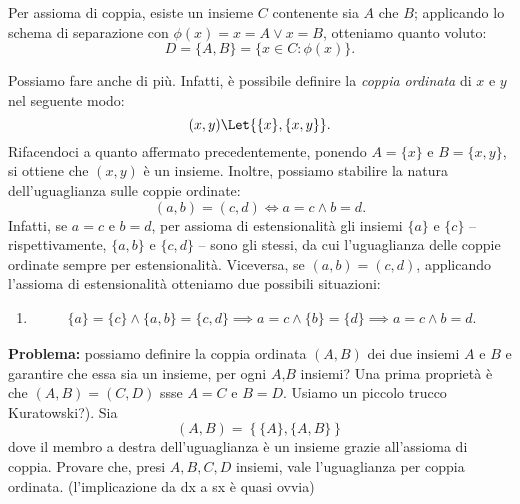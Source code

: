 Per assioma di coppia, esiste un insieme \(C\) contenente sia \(A\) che \(B\); applicando lo schema di separazione con \(\phi(x) = x = A \lor x = B\), otteniamo quanto voluto:
\begin{equation}
  D = \lbrace A, B \rbrace = \lbrace x \in C \colon \phi(x) \rbrace.
\end{equation}

Possiamo fare anche di più. Infatti, è possibile definire la \emph{coppia ordinata} di \(x\) e \(y\) nel seguente modo:
\begin{equation}
  (x, y) \Let \lbrace \lbrace x \rbrace, \lbrace x, y \rbrace \rbrace.
\end{equation}
Rifacendoci a quanto affermato precedentemente, ponendo \(A = \lbrace x \rbrace\) e \(B = \lbrace x, y \rbrace\), si ottiene che \((x, y)\) è un insieme. Inoltre, possiamo stabilire la natura dell'uguaglianza sulle coppie ordinate:
\begin{equation}
  (a,b) = (c,d) \iff a = c \land b = d.
\end{equation}
Infatti, se \(a = c\) e \(b = d\), per assioma di estensionalità gli insiemi \(\lbrace a \rbrace\) e \(\lbrace c \rbrace\) -- rispettivamente, \(\lbrace a, b \rbrace\) e \(\lbrace c, d \rbrace\) -- sono gli stessi, da cui l'uguaglianza delle coppie ordinate sempre per estensionalità.
Viceversa, se \((a, b) = (c, d)\), applicando l'assioma di estensionalità otteniamo due possibili situazioni:
\begin{enumerate}
  \item \begin{align*}
          \lbrace a \rbrace = \lbrace c \rbrace \land \lbrace a, b \rbrace = \lbrace c, d \rbrace \implies a = c \land \lbrace b \rbrace = \lbrace d \rbrace \implies a = c \land b = d.
        \end{align*}
\end{enumerate}

{\bf Problema:} possiamo definire la coppia ordinata \((A,B)\) dei due insiemi \(A\) e \(B\) e garantire che essa sia un insieme, per ogni \(A\),\(B\) insiemi? Una prima proprietà è che \((A,B) = (C,D)\) ssse \(A = C\) e \(B = D\). Usiamo un piccolo trucco Kuratowski?). Sia
\[
(A,B) = \left\lbrace \lbrace A\rbrace, \lbrace A,B \rbrace \right\rbrace
\]
dove il membro a destra dell'uguaglianza è un insieme grazie all'assioma di coppia.
Provare che, presi \(A,B,C,D\) insiemi, vale l'uguaglianza per coppia ordinata. (l'implicazione da dx a sx è quasi ovvia)

